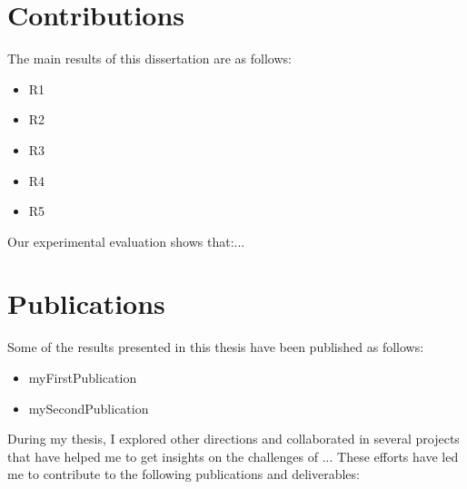 


\section{Contributions}
\label{sec:intro:contributions}

The main results of this dissertation are as follows:
\begin{itemize}[leftmargin=*]
\item
  R1
\item
  R2
\item
  R3
\item
  R4
\item
  R5
\end{itemize}

Our experimental evaluation shows that:...

\section{Publications}
\label{sec:intro:publications}

Some of the results presented in this thesis have been published as follows:

\begin{itemize}
  \item myFirstPublication %
  \item mySecondPublication %
\end{itemize}

During my thesis, I explored other directions and collaborated in several projects that have helped me to get insights on the challenges of ... These efforts have led me to contribute to the following publications and deliverables:

